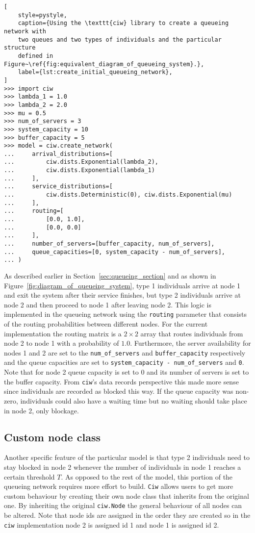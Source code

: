 \begin{lstlisting}[
    style=pystyle,
    caption={Using the \texttt{ciw} library to create a queueing network with
    two queues and two types of individuals and the particular structure
    defined in Figure~\ref{fig:equivalent_diagram_of_queueing_system}.},
    label={lst:create_initial_queueing_network},
]
>>> import ciw
>>> lambda_1 = 1.0
>>> lambda_2 = 2.0
>>> mu = 0.5
>>> num_of_servers = 3
>>> system_capacity = 10
>>> buffer_capacity = 5
>>> model = ciw.create_network(
...     arrival_distributions=[
...         ciw.dists.Exponential(lambda_2),
...         ciw.dists.Exponential(lambda_1)
...     ],
...     service_distributions=[
...         ciw.dists.Deterministic(0), ciw.dists.Exponential(mu)
...     ],
...     routing=[
...         [0.0, 1.0],
...         [0.0, 0.0]
...     ],
...     number_of_servers=[buffer_capacity, num_of_servers],
...     queue_capacities=[0, system_capacity - num_of_servers],
... )

\end{lstlisting}

As described earlier in Section~\ref{sec:queueing_section} and as shown in
Figure~\ref{fig:diagram_of_queueing_system}, type 1 individuals arrive at
node 1 and exit the system after their service finishes, but type 2 individuals
arrive at node 2 and then proceed to node 1 after leaving node 2.
This logic is implemented in the queueing network using the
\texttt{routing} parameter that consists of the routing
probabilities between different nodes.
For the current implementation the routing matrix is a \(2 \times 2\) array
that routes individuals from node 2 to node 1 with a probability of
\(1.0\).
Furthermore, the server availability for nodes 1 and 2 are set to
the \texttt{num\_of\_servers} and
\texttt{buffer\_capacity} respectively and the queue capacities
are set to \texttt{system\_capacity - num\_of\_servers} and \texttt{0}.
Note that for node 2 queue capacity is set to 0 and its
number of servers is set to the buffer capacity.
From \texttt{ciw}'s data records perspective this made more
sense since individuals are recorded as blocked this way.
If the queue capacity was non-zero, individuals could also have a waiting time
but no waiting should take place in node 2, only blockage.


\subsection{Custom node class}
Another specific feature of the particular model is that type 2 individuals
need to stay blocked in node 2 whenever the number of individuals in node 1
reaches a certain threshold \(T\).
As opposed to the rest of the model, this portion of the queueing network
requires more effort to build.
\texttt{Ciw} allows users to get more custom behaviour by
creating their own node class that inherits from the original one.
By inheriting the original \texttt{ciw.Node} the general
behaviour of all nodes can be altered.
Note that node ids are assigned in the order they are created so in the
\texttt{ciw} implementation node 2 is assigned id 1 and node 1
is assigned id 2.


